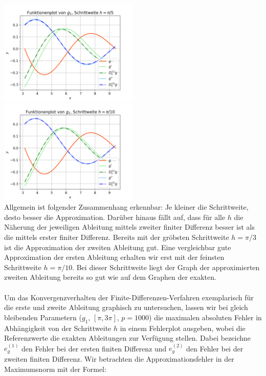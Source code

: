 \documentclass{scrartcl}
\begin{document}
\includegraphics[width=0.5\textwidth]{Grafiken/Funktionenplot_Pi_Funftel} \includegraphics[width=0.5\textwidth]{Grafiken/Funktionenplot_Pi_Zehntel}\\
\vspace{-0.5cm}
\vspace{0.5cm}
Allgemein ist folgender Zusammenhang erkennbar: Je kleiner die Schrittweite, desto besser die Approximation.
Darüber hinaus fällt auf, dass für alle $h$ die Näherung der jeweiligen Ableitung mittels zweiter finiter Differenz besser ist als die mittels erster finiter Differenz.
Bereits mit der gröbsten Schrittweite $h = \pi/3$ ist die Approximation der zweiten Ableitung gut.
Eine vergleichbar gute Approximation der ersten Ableitung erhalten wir erst mit der feinsten Schrittweite $h = \pi/10$.
Bei dieser Schrittweite liegt der Graph der approximierten zweiten Ableitung bereits so gut wie auf dem Graphen der exakten. \\
 \\
Um das Konvergenzverhalten der Finite-Differenzen-Verfahren exemplarisch für die erste und zweite Ableitung graphisch zu untersuchen, lassen wir bei gleich bleibenden Parametern ($g_1$, $[\pi, 3\pi]$, $p = 1000$) die maximalen absoluten Fehler in Abhängigkeit von der Schrittweite $h$ in einem Fehlerplot ausgeben, wobei die Referenzwerte die exakten Ableitungen zur Verfügung stellen. Dabei bezeichne $e_g^{(1)}$ den Fehler bei der ersten finiten Differenz und $e_g^{(2)}$ den Fehler bei der zweiten finiten Differenz. Wir betrachten die Approximationsfehler in der Maximumsnorm mit der Formel:
\end{document}
